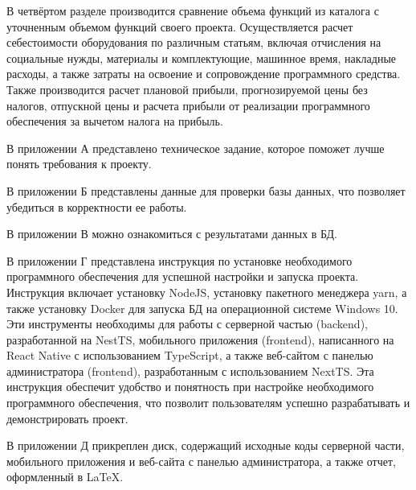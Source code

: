 В четвёртом разделе
производится сравнение объема функций из каталога с уточненным объемом функций своего проекта.
Осуществляется расчет себестоимости оборудования по различным статьям,
включая отчисления на социальные нужды, материалы и комплектующие,
машинное время, накладные расходы, а также затраты на освоение и сопровождение программного средства.
Также производится расчет плановой прибыли, прогнозируемой цены без налогов, отпускной цены и
расчета прибыли от реализации программного обеспечения за вычетом налога на прибыль.

В приложении А
представлено техническое задание, которое поможет лучше понять требования к проекту.

В приложении Б
представлены данные для проверки базы данных, что позволяет убедиться в корректности ее работы.

В приложении В
можно ознакомиться с результатами данных в БД.

В приложении Г
представлена инструкция по установке необходимого программного обеспечения для успешной настройки и запуска проекта.
Инструкция включает установку NodeJS, установку пакетного менеджера yarn,
а также установку Docker для запуска БД на операционной системе Windows 10.
Эти инструменты необходимы для работы с серверной частью (backend), разработанной на NestTS,
мобильного приложения (frontend), написанного на React Native с использованием TypeScript,
а также веб-сайтом с панелью администратора (frontend), разработанным с использованием NextTS.
Эта инструкция обеспечит удобство и понятность при настройке необходимого программного обеспечения,
что позволит пользователям успешно разрабатывать и демонстрировать проект.

В приложении Д
прикреплен диск, содержащий исходные коды серверной части,
мобильного приложения и веб-сайта с панелью администратора,
а также отчет, оформленный в LaTeX.


\newpage
